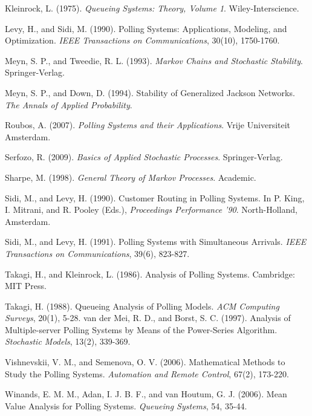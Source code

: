 \begin{thebibliography}{99}
 Kleinrock, L. (1975). \textit{Queueing Systems: Theory, Volume 1}. Wiley-Interscience.

 Levy, H., and Sidi, M. (1990). Polling Systems: Applications, Modeling, and Optimization. \textit{IEEE Transactions on Communications}, 30(10), 1750-1760.


 Meyn, S. P., and Tweedie, R. L. (1993). \textit{Markov Chains and Stochastic Stability}. Springer-Verlag.

 Meyn, S. P., and Down, D. (1994). Stability of Generalized Jackson Networks. \textit{The Annals of Applied Probability}.


 Roubos, A. (2007). \textit{Polling Systems and their Applications}. Vrije Universiteit Amsterdam.

 Serfozo, R. (2009). \textit{Basics of Applied Stochastic Processes}. Springer-Verlag.

 Sharpe, M. (1998). \textit{General Theory of Markov Processes}. Academic.


 Sidi, M., and Levy, H. (1990). Customer Routing in Polling Systems. In P. King, I. Mitrani, and R. Pooley (Eds.), \textit{Proceedings Performance '90}. North-Holland, Amsterdam.

 Sidi, M., and Levy, H. (1991). Polling Systems with Simultaneous Arrivals. \textit{IEEE Transactions on Communications}, 39(6), 823-827.

 Takagi, H., and Kleinrock, L. (1986). Analysis of Polling Systems. Cambridge: MIT Press.

 Takagi, H. (1988). Queueing Analysis of Polling Models. \textit{ACM Computing Surveys}, 20(1), 5-28.
 van der Mei, R. D., and Borst, S. C. (1997). Analysis of Multiple-server Polling Systems by Means of the Power-Series Algorithm. \textit{Stochastic Models}, 13(2), 339-369.


 Vishnevskii, V. M., and Semenova, O. V. (2006). Mathematical Methods to Study the Polling Systems. \textit{Automation and Remote Control}, 67(2), 173-220.

 Winands, E. M. M., Adan, I. J. B. F., and van Houtum, G. J. (2006). Mean Value Analysis for Polling Systems. \textit{Queueing Systems}, 54, 35-44.
\end{thebibliography}
